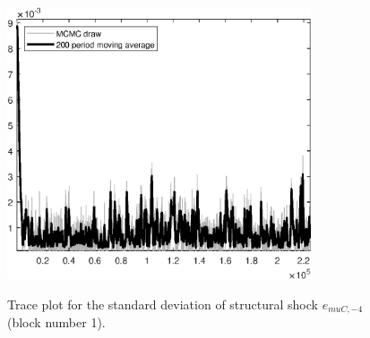 \begin{figure}[H]
\centering
  \includegraphics[width=0.8\textwidth]{BRS_sectoral/graphs/TracePlot_SE_e_muC_news_blck_1}\\
    \caption{Trace plot for the standard deviation of structural shock ${e_{muC,-4}}$ (block number 1).}
\end{figure}
